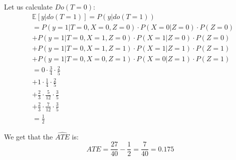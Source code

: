 \documentclass{article}
\begin{document}
Let us calculate $Do(T=0)$:
\begin{equation*}
    \begin{split}
	& \mathds{E}[y|do(T=1)] = P(y|do(T=1)) \\
        & = P(y=1|T=0, X=0, Z=0)\cdot{}P(X=0|Z=0)\cdot{}P(Z=0) \\
        & +P(y=1|T=0, X=1, Z=0)\cdot{}P(X=1|Z=0)\cdot{}P(Z=0) \\
        & +P(y=1|T=0, X=1, Z=1)\cdot{}P(X=1|Z=1)\cdot{}P(Z=1) \\
        & +P(y=1|T=0, X=0, Z=1)\cdot{}P(X=0|Z=1)\cdot{}P(Z=1) \\
        & = 0 \cdot \frac{3}{4} \cdot \frac{2}{5} \\
        & + 1 \cdot \frac{1}{4} \cdot \frac{2}{5} \\
        & + \frac{2}{3} \cdot \frac{5}{12} \cdot \frac{3}{5} \\
        & + \frac{2}{3} \cdot \frac{7}{12} \cdot \frac{3}{5} \\
        & = \frac{1}{2}
    \end{split}
\end{equation*}


We get that the $\hat{ATE}$ is:
\begin{equation*}
    \hat{ATE} = \frac{27}{40} - \frac{1}{2} = \frac{7}{40}=0.175
\end{equation*}
\end{document}
